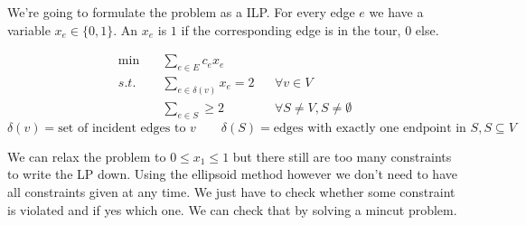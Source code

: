 \begin{Ex} We're going to formulate the problem as a ILP. For every edge $e$ we have a variable $x_e\in \{0,1\}$. An $x_e$ is $1$ if the corresponding edge is in the tour, $0$ else.

\begin{align*}
\min \quad & \sum_{e\in E} c_e x_e\\
s.t. & \sum_{e\in \delta(v)} x_e = 2 && \forall v\in V\\
	& \sum_{e\in S} \geq 2 && \forall S\neq V, S\neq \emptyset
\end{align*}
\[\delta(v) = \text{set of incident edges to $v$} \qquad \delta(S) = \text{edges with exactly one endpoint in $S$}, S\subseteq V\]

We can relax the problem to $0\leq x_1 \leq 1$ but there still are too many constraints to write the LP down. Using the ellipsoid method however we don't need to have all constraints given at any time. We just have to check whether some constraint is violated and if yes which one. We can check that by solving a mincut problem.
\end{Ex}